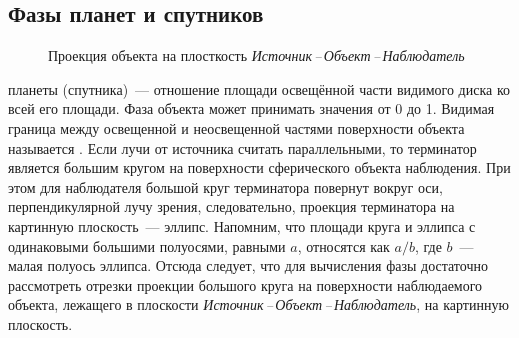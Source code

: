 \subsection{Фазы планет и спутников}

\begin{wrapfigure}[10]{r}{.3\tw}
    \centering
    \vspace{-1pc}
    \caption{Проекция объекта на плосткость {\slshape Источник\,--\,Объект\,--\,Наб\-людатель}}
    \label{pic:phase-angle-1}
\end{wrapfigure}

 планеты (спутника)~--- отношение площади освещённой  части видимого диска ко всей его площади. Фаза объекта может принимать значения от 0 до 1. Видимая граница между освещенной и неосвещенной частями поверхности объекта называется . Если лучи от источника считать параллельными, то терминатор является большим кругом на поверхности сферического объекта наблюдения. При этом для наблюдателя большой круг терминатора повернут вокруг оси, перпендикулярной лучу зрения, следовательно, проекция терминатора на картинную плоскость~--- эллипс. Напомним, что площади круга и эллипса с одинаковыми большими полуосями, равными $a$, относятся как $a/b$, где $b$~--- малая полуось эллипса. Отсюда следует, что для вычисления фазы достаточно рассмотреть отрезки проекции большого круга на поверхности наблюдаемого объекта, лежащего в плоскости {\slshape Источник\,--\,Объект\,--\,Наблюдатель}, на картинную плоскость.

